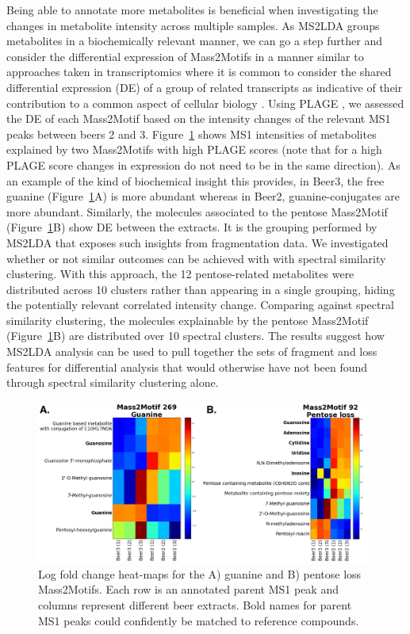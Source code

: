 Being able to annotate more metabolites is beneficial when investigating the changes in metabolite intensity across multiple samples. As MS2LDA groups metabolites in a biochemically relevant manner, we can go a step further and consider the differential expression of Mass2Motifs in a manner similar to approaches taken in transcriptomics where it is common to consider the shared differential expression (DE) of a group of related transcripts as indicative of their contribution to a common aspect of cellular biology \cite{tarca2013comparison}. Using PLAGE \cite{tomfohr2005pathway}, we assessed the DE of each Mass2Motif based on the intensity changes of the relevant MS1 peaks between beers 2 and 3. Figure~\ref{fig:m2lda-heatmaps} shows MS1 intensities of metabolites explained by two Mass2Motifs with high PLAGE scores (note that for a high PLAGE score changes in expression do not need to be in the same direction). As an example of the kind of biochemical insight this provides, in Beer3, the free guanine (Figure~\ref{fig:m2lda-heatmaps}A) is more abundant whereas in Beer2, guanine-conjugates are more abundant. Similarly, the molecules associated to the pentose Mass2Motif (Figure~\ref{fig:m2lda-heatmaps}B) show DE between the extracts. It is the grouping performed by MS2LDA that exposes such insights from fragmentation data. We investigated whether or not similar outcomes can be achieved with with spectral similarity clustering. With this approach, the 12 pentose-related metabolites were distributed across 10 clusters rather than appearing in a single grouping, hiding the potentially relevant correlated intensity change. Comparing against spectral similarity clustering, the molecules explainable by the pentose Mass2Motif (Figure~\ref{fig:m2lda-heatmaps}B) are distributed over 10 spectral clusters. The results suggest how MS2LDA analysis can be used to pull together the sets of fragment and loss features for differential analysis that would otherwise have not been found through spectral similarity clustering alone.

\begin{figure}[!htbp]
\centering\includegraphics[width=1.0\linewidth]{07-lda/figures/heatmaps.png}
\centering\caption{Log fold change heat-maps for the A) guanine and B) pentose loss Mass2Motifs. Each row is an annotated parent MS1 peak and columns represent different beer extracts. Bold names for parent MS1 peaks could confidently be matched to reference compounds. \label{fig:m2lda-heatmaps}}
\end{figure}

